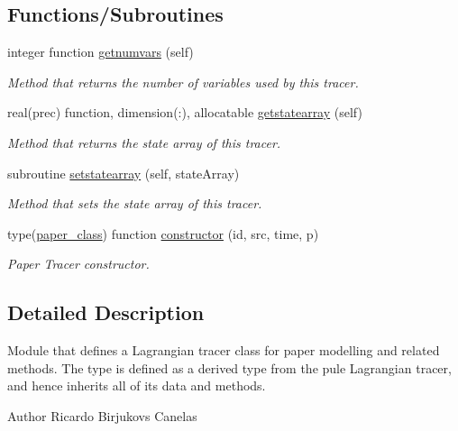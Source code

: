 \subsection*{Functions/\+Subroutines}
\begin{DoxyCompactItemize}
\item 
integer function \mbox{\hyperlink{namespacetracerpaper__mod_a62f88159b0746351f3b3a09a6a9dfff4}{getnumvars}} (self)
\begin{DoxyCompactList}\small\item\em Method that returns the number of variables used by this tracer. \end{DoxyCompactList}\item 
real(prec) function, dimension(\+:), allocatable \mbox{\hyperlink{namespacetracerpaper__mod_a703693333469e5091ec8de0a62171294}{getstatearray}} (self)
\begin{DoxyCompactList}\small\item\em Method that returns the state array of this tracer. \end{DoxyCompactList}\item 
subroutine \mbox{\hyperlink{namespacetracerpaper__mod_abda951b1d3a953fc25f24ee3ce8e2025}{setstatearray}} (self, state\+Array)
\begin{DoxyCompactList}\small\item\em Method that sets the state array of this tracer. \end{DoxyCompactList}\item 
type(\mbox{\hyperlink{structtracerpaper__mod_1_1paper__class}{paper\+\_\+class}}) function \mbox{\hyperlink{namespacetracerpaper__mod_ad1bbc9d4e889b6aab71f0333cf6a5365}{constructor}} (id, src, time, p)
\begin{DoxyCompactList}\small\item\em Paper Tracer constructor. \end{DoxyCompactList}\end{DoxyCompactItemize}


\subsection{Detailed Description}
Module that defines a Lagrangian tracer class for paper modelling and related methods. The type is defined as a derived type from the pule Lagrangian tracer, and hence inherits all of it\textquotesingle{}s data and methods. 

\begin{DoxyAuthor}{Author}
Ricardo Birjukovs Canelas 
\end{DoxyAuthor}


